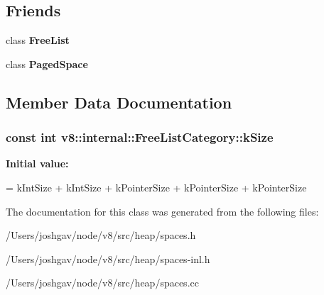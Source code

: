 \subsection*{Friends}
\begin{DoxyCompactItemize}
\item 
class {\bfseries Free\+List}\hypertarget{classv8_1_1internal_1_1_free_list_category_aef93a5461456ab609efd34caf72f8764}{}\label{classv8_1_1internal_1_1_free_list_category_aef93a5461456ab609efd34caf72f8764}

\item 
class {\bfseries Paged\+Space}\hypertarget{classv8_1_1internal_1_1_free_list_category_a57d18a423c610563132a99ab1e1c1b8e}{}\label{classv8_1_1internal_1_1_free_list_category_a57d18a423c610563132a99ab1e1c1b8e}

\end{DoxyCompactItemize}


\subsection{Member Data Documentation}
\subsubsection[{\texorpdfstring{k\+Size}{kSize}}]{\setlength{\rightskip}{0pt plus 5cm}const int v8\+::internal\+::\+Free\+List\+Category\+::k\+Size\hspace{0.3cm}{\ttfamily [static]}}\hypertarget{classv8_1_1internal_1_1_free_list_category_ad1412031fb4236c8598b2bd52c4bdda9}{}\label{classv8_1_1internal_1_1_free_list_category_ad1412031fb4236c8598b2bd52c4bdda9}
{\bfseries Initial value\+:}
\begin{DoxyCode}
= kIntSize +      
                           kIntSize +      
                           kPointerSize +  
                           kPointerSize +  
                           kPointerSize
\end{DoxyCode}


The documentation for this class was generated from the following files\+:\begin{DoxyCompactItemize}
\item 
/\+Users/joshgav/node/v8/src/heap/spaces.\+h\item 
/\+Users/joshgav/node/v8/src/heap/spaces-\/inl.\+h\item 
/\+Users/joshgav/node/v8/src/heap/spaces.\+cc\end{DoxyCompactItemize}
